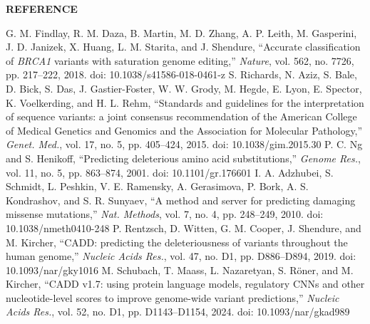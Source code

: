 \newpage
\label{s:ref:start}
\makeatletter
\renewenvironment{thebibliography}[1]{\list{\@biblabel{\arabic{enumiv}}}{\leftmargin=33.8pt\labelwidth=26.7pt\labelsep=0pt\itemsep=3pt\parsep=0pt\topsep=0pt\usecounter{enumiv}\let\p@enumiv\@empty\renewcommand\theenumiv{\arabic{enumiv}}}\sloppy}{\endlist}
\renewcommand\@biblabel[1]{[#1]\hfill}
\makeatother
\par\noindent\begin{center}{\fontsize{16}{20.65}\selectfont\bfseries REFERENCE}\end{center}
\vspace{4pt}
\begin{thebibliography}{99}
 G. M. Findlay, R. M. Daza, B. Martin, M. D. Zhang, A. P. Leith, M. Gasperini, J. D. Janizek, X. Huang, L. M. Starita, and J. Shendure, ``Accurate classification of \emph{BRCA1} variants with saturation genome editing,'' \emph{Nature}, vol. 562, no. 7726, pp. 217--222, 2018. doi: 10.1038/\allowbreak s41586-018-0461-z
 S. Richards, N. Aziz, S. Bale, D. Bick, S. Das, J. Gastier-Foster, W. W. Grody, M. Hegde, E. Lyon, E. Spector, K. Voelkerding, and H. L. Rehm, ``Standards and guidelines for the interpretation of sequence variants: a joint consensus recommendation of the American College of Medical Genetics and Genomics and the Association for Molecular Pathology,'' \emph{Genet. Med.}, vol. 17, no. 5, pp. 405--424, 2015. doi: 10.1038/\allowbreak gim.2015.30
 P. C. Ng and S. Henikoff, ``Predicting deleterious amino acid substitutions,'' \emph{Genome Res.}, vol. 11, no. 5, pp. 863--874, 2001. doi: 10.1101/\allowbreak gr.176601
 I. A. Adzhubei, S. Schmidt, L. Peshkin, V. E. Ramensky, A. Gerasimova, P. Bork, A. S. Kondrashov, and S. R. Sunyaev, ``A method and server for predicting damaging missense mutations,'' \emph{Nat. Methods}, vol. 7, no. 4, pp. 248--249, 2010. doi: 10.1038/\allowbreak nmeth0410-248
 P. Rentzsch, D. Witten, G. M. Cooper, J. Shendure, and M. Kircher, ``CADD: predicting the deleteriousness of variants throughout the human genome,'' \emph{Nucleic Acids Res.}, vol. 47, no. D1, pp. D886--D894, 2019. doi: 10.1093/\allowbreak nar/\allowbreak gky1016
 M. Schubach, T. Maass, L. Nazaretyan, S. Röner, and M. Kircher, ``CADD v1.7: using protein language models, regulatory CNNs and other nucleotide-level scores to improve genome-wide variant predictions,'' \emph{Nucleic Acids Res.}, vol. 52, no. D1, pp. D1143--D1154, 2024. doi: 10.1093/\allowbreak nar/\allowbreak gkad989

\end{thebibliography}
